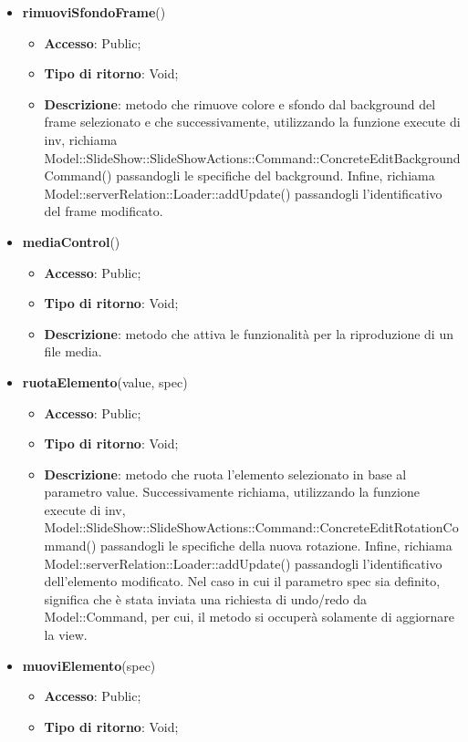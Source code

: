 {{\begin{itemize}
\begin{itemize}
		\end{itemize}
		\item \textbf{rimuoviSfondoFrame}()
		\begin{itemize}
			\item \textbf{Accesso}: Public;
			\item \textbf{Tipo di ritorno}: Void;
			\item \textbf{Descrizione}: metodo che rimuove colore e sfondo dal background del frame selezionato e che successivamente, utilizzando la funzione execute di inv, richiama Model::\-SlideShow::\-SlideShowActions::\-Command::\-ConcreteEditBackgroundCommand() passandogli le specifiche del background. Infine, richiama Model::\-serverRelation::\-Loader::\-addUpdate() passandogli l'identificativo del frame modificato.
		\end{itemize}
		\item \textbf{mediaControl}()
		\begin{itemize}
			\item \textbf{Accesso}: Public;
			\item \textbf{Tipo di ritorno}: Void;
			\item \textbf{Descrizione}: metodo che attiva le funzionalità per la riproduzione di un file media.
		\end{itemize}
		\item \textbf{ruotaElemento}(value, spec)
		\begin{itemize}
			\item \textbf{Accesso}: Public;
			\item \textbf{Tipo di ritorno}: Void;
			\item \textbf{Descrizione}: metodo che ruota l'elemento selezionato in base al parametro value. Successivamente richiama, utilizzando la funzione execute di inv, Model::\-SlideShow::\-SlideShowActions::\-Command::\-ConcreteEditRotationCommand() passandogli le specifiche della nuova rotazione. Infine, richiama Model::\-serverRelation::\-Loader::\-addUpdate() passandogli l'identificativo dell'elemento modificato. Nel caso in cui il parametro spec sia definito, significa che è stata inviata una richiesta di undo/redo da Model::\-Command, per cui, il metodo si occuperà solamente di aggiornare la view.
		\end{itemize}
		\item \textbf{muoviElemento}(spec)
		\begin{itemize}
			\item \textbf{Accesso}: Public;
			\item \textbf{Tipo di ritorno}: Void;

\end{itemize}
\end{itemize}}}
